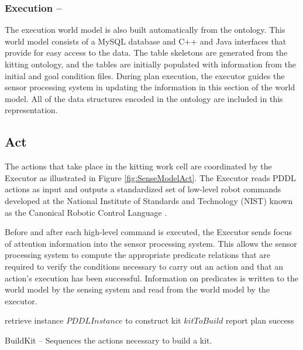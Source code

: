 \subsubsection{Execution --}
The execution world model is also built automatically from the ontology. This world model consists of a MySQL database and C++ and Java
interfaces that provide for easy access to the data. The table skeletons are generated from the kitting ontology, and the tables are initially populated
with information from the initial and goal condition files. During plan execution, the executor guides the sensor processing system
in updating the information in 
this section of the world model. All of the data structures encoded in the ontology are included in this representation. 
%
\subsection{Act}
\label{subsection:Act}
The actions that take place in the kitting work cell are coordinated by the Executor as illustrated in Figure \ref{fig:SenseModelAct}.  The Executor
reads PDDL actions as input and outputs a standardized set of low-level robot commands developed at the National Institute of Standards
and Technology (NIST) known as the  Canonical Robotic Control Language \cite{Balakirsky2012-1}. 

Before and after each high-level command
is executed, the Executor sends focus of attention information into the sensor processing system. This allows the sensor processing system to compute
the appropriate predicate relations that are required to verify the conditions necessary to carry out an action and that an action's execution has
been successful. Information on predicates is written to the world model by the sensing system and read from the world model by the executor.
%
\\
\begin{algorithm}[h!]

 	retrieve instance $PDDLInstance$ to construct kit $kitToBuild$\;
 	report plan success\;
\caption{{\sc BuildKit} -- Sequences the actions necessary to build a kit.}
\label{fig:buildkit}
\end{algorithm}
%